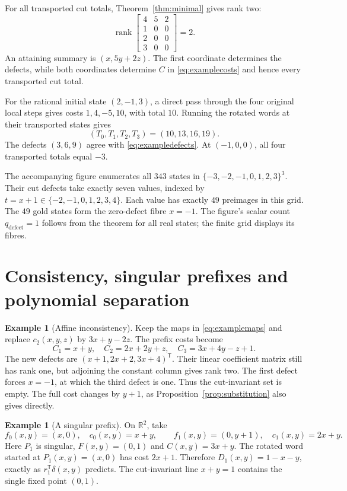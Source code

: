 \documentclass[11pt,a4paper]{article}
\theoremstyle{definition}\newtheorem{definition}[theorem]{Definition}\newtheorem{example}[theorem]{Example}\newtheorem{remark}[theorem]{Remark}
\DeclareMathOperator{\rank}{rank}\DeclareMathOperator{\im}{im}\DeclareMathOperator{\spanop}{span}\DeclareMathOperator{\diag}{diag}
\newcommand{\R}{\mathbb R}\newcommand{\Q}{\mathbb Q}\newcommand{\Z}{\mathbb Z}\newcommand{\N}{\mathbb N}\newcommand{\id}{\mathrm{id}}
\begin{document}
For all transported cut totals, Theorem~\ref{thm:minimal} gives rank two:
\[
 \rank\begin{bmatrix}4&5&2\\1&0&0\\2&0&0\\3&0&0\end{bmatrix}=2.
\]
An attaining summary is $(x,5y+2z)$. The first coordinate determines
the defects, while both coordinates determine $C$ in
\eqref{eq:examplecosts} and hence every transported cut total.

For the rational initial state $(2,-1,3)$, a direct pass through the
four original local steps gives costs $1,4,-5,10$, with total $10$.
Running the rotated words at their transported states gives
\[
 (T_0,T_1,T_2,T_3)=(10,13,16,19).
\]
The defects $(3,6,9)$ agree with \eqref{eq:exampledefects}.
At $(-1,0,0)$, all four transported totals equal $-3$.

The accompanying figure enumerates all $343$ states in
$\{-3,-2,-1,0,1,2,3\}^3$. Their cut defects take exactly seven
values, indexed by $t=x+1\in\{-2,-1,0,1,2,3,4\}$.
Each value has exactly $49$ preimages in this grid. The $49$ gold
states form the zero-defect fibre $x=-1$. The figure's scalar count
$q_{\mathrm{defect}}=1$ follows from the theorem for all real states;
the finite grid displays its fibres.

\section{Consistency, singular prefixes and polynomial separation}
\begin{example}[Affine inconsistency]\label{ex:inconsistent}
Keep the maps in \eqref{eq:examplemaps} and replace
$c_2(x,y,z)$ by $3x+y-2z$. The prefix costs become
\[
 C_1=x+y,\quad C_2=2x+2y+z,\quad C_3=3x+4y-z+1.
\]
The new defects are
$(x+1,2x+2,3x+4)^{\mathsf T}$. Their linear coefficient matrix
still has rank one, but adjoining the constant column gives rank two.
The first defect forces $x=-1$, at which the third defect is one.
Thus the cut-invariant set is empty. The full cost changes by
$y+1$, as Proposition~\ref{prop:substitution} also gives directly.
\end{example}

\begin{example}[A singular prefix]\label{ex:singular}
On $\R^2$, take
\[
 f_0(x,y)=(x,0),\quad c_0(x,y)=x+y,\qquad
 f_1(x,y)=(0,y+1),\quad c_1(x,y)=2x+y.
\]
Here $P_1$ is singular, $F(x,y)=(0,1)$ and $C(x,y)=3x+y$.
The rotated word started at $P_1(x,y)=(x,0)$ has cost $2x+1$.
Therefore $D_1(x,y)=1-x-y$, exactly as
$r_1^{\mathsf T}\delta(x,y)$ predicts. The cut-invariant line
$x+y=1$ contains the single fixed point $(0,1)$.
\end{example}
\end{document}

